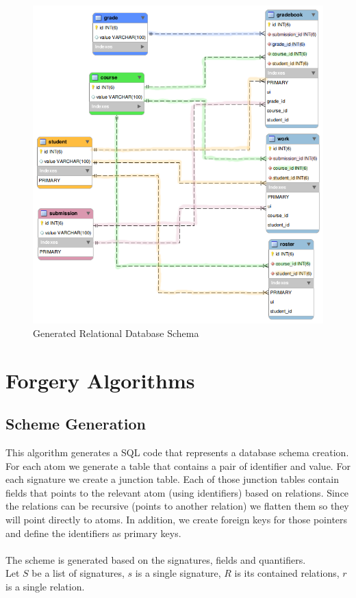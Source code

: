 \documentclass[oneside]{book}
\begin{document}
\newpage

\begin{figure}[h!]
\centering
\includegraphics[scale=0.5]{3}
\caption{Generated Relational Database Schema}
\end{figure}

\newpage

\section{Forgery Algorithms}
\label{sec:algorithm}

\subsection{Scheme Generation}
This algorithm generates a SQL code that represents a database schema creation. For each atom we generate a table that contains a pair of identifier and value. For each signature we create a junction table. Each of those junction tables contain fields that points to the relevant atom (using identifiers) based on relations. Since the relations can be recursive (points to another relation) we flatten them so they will point directly to atoms. In addition, we create foreign keys for those pointers and define the identifiers as primary keys.
\\\\
The scheme is generated based on the signatures, fields and quantifiers.\\
Let $S$ be a list of signatures, $s$ is a single signature, $R$ is its contained relations, $r$ is a single relation.
\end{document}
